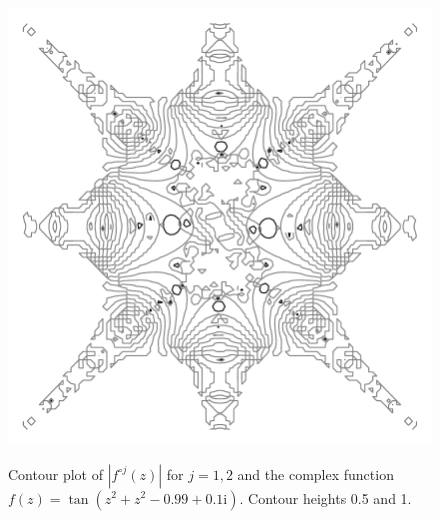\documentclass[12pt, a4paper]{amsart}
\newcommand{\mi}{\text{i}}  %
\begin{document}
\pagebreak
\begin{figure}[!ht]
\includegraphics[width=160mm]{mite.pdf}\\[10mm]
\caption{
Contour plot of $|f^{\circ j}(z)|$ for $j = 1, 2$ and the complex function $f(z) = \tan(z^2  + z^2 - 0.99 + 0.1\mi)$.
Contour heights 0.5 and 1.
}
\end{figure}
\pagebreak
\end{document}
